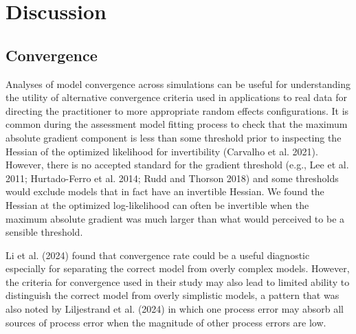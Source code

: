 \documentclass[
  12pt,
]{article}
\begin{document}
\section*{Discussion}\label{discussion}

\subsection*{Convergence}\label{convergence-1}

Analyses of model convergence across simulations can be useful for
understanding the utility of alternative convergence criteria used in
applications to real data for directing the practitioner to more
appropriate random effects configurations. It is common during the
assessment model fitting process to check that the maximum absolute
gradient component is less than some threshold prior to inspecting the
Hessian of the optimized likelihood for invertibility (Carvalho et al.
2021). However, there is no accepted standard for the gradient threshold
(e.g., Lee et al. 2011; Hurtado-Ferro et al. 2014; Rudd and Thorson
2018) and some thresholds would exclude models that in fact have an
invertible Hessian. We found the Hessian at the optimized log-likelihood
can often be invertible when the maximum absolute gradient was much
larger than what would perceived to be a sensible threshold.

Li et al. (2024) found that convergence rate could be a useful
diagnostic especially for separating the correct model from overly
complex models. However, the criteria for convergence used in their
study may also lead to limited ability to distinguish the correct model
from overly simplistic models, a pattern that was also noted by
Liljestrand et al. (2024) in which one process error may absorb all
sources of process error when the magnitude of other process errors are
low.
\end{document}
